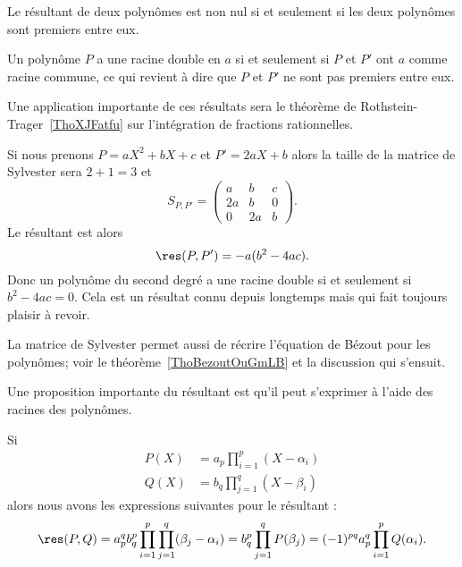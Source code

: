 \begin{proposition} \label{PropAPxzcUl}
	Le résultant de deux polynômes est non nul si et seulement si les deux polynômes sont premiers entre eux.
\end{proposition}

Un polynôme \( P\) a une racine double en \( a\) si et seulement si \( P\) et \( P'\) ont \( a\) comme racine commune, ce qui revient à dire que \( P\) et \( P'\) ne sont pas premiers entre eux.

Une application importante de ces résultats sera le théorème de Rothstein-Trager~\ref{ThoXJFatfu} sur l'intégration de fractions rationnelles.

\begin{example}
	Si nous prenons \( P=aX^2+bX+c\) et \( P'=2aX+b\) alors la taille de la matrice de Sylvester sera \( 2+1=3\) et
	\begin{equation}
		S_{P,P'}=\begin{pmatrix}
			a  & b  & c \\
			2a & b  & 0 \\
			0  & 2a & b
		\end{pmatrix}.
	\end{equation}
	Le résultant est alors
	\begin{equation}
		\res(P,P')=-a(b^2-4ac).
	\end{equation}
	Donc un polynôme du second degré a une racine double si et seulement si \( b^2-4ac=0\). Cela est un résultat connu depuis longtemps mais qui fait toujours plaisir à revoir.
\end{example}

La matrice de Sylvester permet aussi de récrire l'équation de Bézout pour les polynômes; voir le théorème~\ref{ThoBezoutOuGmLB} et la discussion qui s'ensuit.

Une proposition importante du résultant est qu'il peut s'exprimer à l'aide des racines des polynômes.
\begin{proposition} \label{PropNDBOGNx}
	Si
	\begin{subequations}
		\begin{align}
			P(X) & =a_p\prod_{i=1}^p(X-\alpha_i) \\
			Q(X) & =b_q\prod_{j=1}^q(X-\beta_i)
		\end{align}
	\end{subequations}
	alors nous avons les expressions suivantes pour le résultant :
	\begin{equation}        \label{EqCFUumjx}
		\res(P,Q)=a_p^qb_q^p\prod_{i=1}^p\prod_{j=1}^q(\beta_j-\alpha_i)=b_q^p\prod_{j=1}^qP(\beta_j)=(-1)^{pq}a_p^q\prod_{i=1}^pQ(\alpha_i).
	\end{equation}
\end{proposition}

